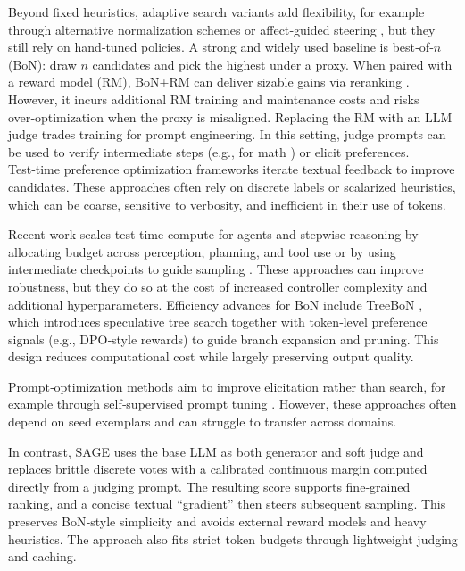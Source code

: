 \documentclass{article}
\theoremstyle{plain}
\theoremstyle{definition}
\theoremstyle{remark}
\newcommand{\method}{SAGE} %
\begin{document}
Beyond fixed heuristics, adaptive search variants add flexibility, for example through alternative normalization schemes or affect‑guided steering \citep{freitag2017beam,huang2023affective}, but they still rely on hand‑tuned policies. A strong and widely used baseline is best‑of‑\(n\) (BoN): draw \(n\) candidates and pick the highest under a proxy. When paired with a reward model (RM), BoN+RM can deliver sizable gains via reranking \citep[e.g., human‑feedback pipelines such as][]{stiennon2020learning}. However, it incurs additional RM training and maintenance costs and risks over‑optimization when the proxy is misaligned. Replacing the RM with an LLM judge trades training for prompt engineering. In this setting, judge prompts can be used to verify intermediate steps (e.g., for math \citep{mahdavi2025scaling}) or elicit preferences. Test‑time preference optimization frameworks \citep{litest} iterate textual feedback to improve candidates. These approaches often rely on discrete labels or scalarized heuristics, which can be coarse, sensitive to verbosity, and inefficient in their use of tokens.

Recent work scales test‑time compute for agents and stepwise reasoning by allocating budget across perception, planning, and tool use \citep{zhu2025scaling} or by using intermediate checkpoints to guide sampling \citep{wang2025stepwise}. These approaches can improve robustness, but they do so at the cost of increased controller complexity and additional hyperparameters. Efficiency advances for BoN include TreeBoN \citep{qiu2024treebon}, which introduces speculative tree search together with token‑level preference signals (e.g., DPO‑style rewards) to guide branch expansion and pruning. This design reduces computational cost while largely preserving output quality.

Prompt‑optimization methods aim to improve elicitation rather than search, for example through self‑supervised prompt tuning \citep{xiang2025self}. However, these approaches often depend on seed exemplars and can struggle to transfer across domains.

In contrast, \method{} uses the base LLM as both generator and soft judge and replaces brittle discrete votes with a calibrated continuous margin computed directly from a judging prompt. The resulting score supports fine‑grained ranking, and a concise textual “gradient” then steers subsequent sampling. This preserves BoN‑style simplicity and avoids external reward models and heavy heuristics. The approach also fits strict token budgets through lightweight judging and caching.
\end{document}
